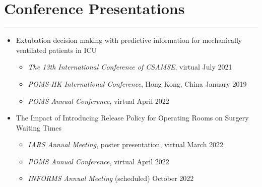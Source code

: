 \documentclass[12pt, a4paper]{article}
\begin{document}
{\begin{enumerate}[leftmargin=36pt, itemsep=6pt, parsep=0.2pt, topsep=1pt]
\end{enumerate}




\section*{Conference Presentations}
\vspace*{0.4em}
\hrule height 0.5pt
\begin{itemize}[leftmargin=36pt, itemsep=6pt, parsep=0.2pt, topsep=1pt]

	\item Extubation decision making with predictive information for mechanically ventilated patients in ICU

	\begin{itemize}[leftmargin=20pt, itemsep=2pt, topsep=2pt]

		\item {\it The 13th International Conference of CSAMSE}, virtual \hfill July 2021

		\item {\it POMS-HK International Conference}, Hong Kong, China \hfill January 2019
		
		\item {\it POMS Annual Conference}, virtual \hfill April 2022

	\end{itemize}

	\item The Impact of Introducing Release Policy for Operating Rooms on Surgery Waiting Times

	\begin{itemize}[leftmargin=20pt, itemsep=2pt, topsep=2pt]
		
		\item {\it IARS Annual Meeting}, poster presentation, virtual \hfill March 2022

		\item {\it POMS Annual Conference}, virtual \hfill April 2022

		\item {\it INFORMS Annual Meeting} (scheduled) \hfill October 2022
	
	\end{itemize}

\end{itemize}



}
\end{document}
